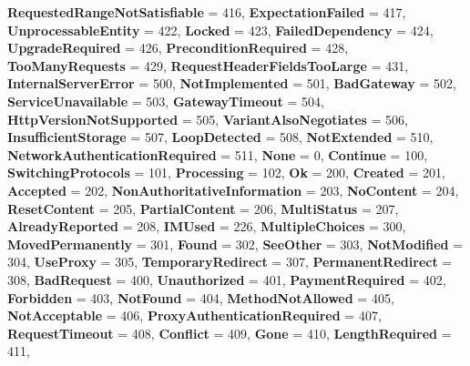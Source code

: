 \begin{DoxyCompactItemize}
{\bfseries Requested\+Range\+Not\+Satisfiable} = 416, 
{\bfseries Expectation\+Failed} = 417, 
{\bfseries Unprocessable\+Entity} = 422, 
{\bfseries Locked} = 423, 
\newline
{\bfseries Failed\+Dependency} = 424, 
{\bfseries Upgrade\+Required} = 426, 
{\bfseries Precondition\+Required} = 428, 
{\bfseries Too\+Many\+Requests} = 429, 
\newline
{\bfseries Request\+Header\+Fields\+Too\+Large} = 431, 
{\bfseries Internal\+Server\+Error} = 500, 
{\bfseries Not\+Implemented} = 501, 
{\bfseries Bad\+Gateway} = 502, 
\newline
{\bfseries Service\+Unavailable} = 503, 
{\bfseries Gateway\+Timeout} = 504, 
{\bfseries Http\+Version\+Not\+Supported} = 505, 
{\bfseries Variant\+Also\+Negotiates} = 506, 
\newline
{\bfseries Insufficient\+Storage} = 507, 
{\bfseries Loop\+Detected} = 508, 
{\bfseries Not\+Extended} = 510, 
{\bfseries Network\+Authentication\+Required} = 511, 
\newline
{\bfseries None} = 0, 
{\bfseries Continue} = 100, 
{\bfseries Switching\+Protocols} = 101, 
{\bfseries Processing} = 102, 
\newline
{\bfseries Ok} = 200, 
{\bfseries Created} = 201, 
{\bfseries Accepted} = 202, 
{\bfseries Non\+Authoritative\+Information} = 203, 
\newline
{\bfseries No\+Content} = 204, 
{\bfseries Reset\+Content} = 205, 
{\bfseries Partial\+Content} = 206, 
{\bfseries Multi\+Status} = 207, 
\newline
{\bfseries Already\+Reported} = 208, 
{\bfseries I\+M\+Used} = 226, 
{\bfseries Multiple\+Choices} = 300, 
{\bfseries Moved\+Permanently} = 301, 
\newline
{\bfseries Found} = 302, 
{\bfseries See\+Other} = 303, 
{\bfseries Not\+Modified} = 304, 
{\bfseries Use\+Proxy} = 305, 
\newline
{\bfseries Temporary\+Redirect} = 307, 
{\bfseries Permanent\+Redirect} = 308, 
{\bfseries Bad\+Request} = 400, 
{\bfseries Unauthorized} = 401, 
\newline
{\bfseries Payment\+Required} = 402, 
{\bfseries Forbidden} = 403, 
{\bfseries Not\+Found} = 404, 
{\bfseries Method\+Not\+Allowed} = 405, 
\newline
{\bfseries Not\+Acceptable} = 406, 
{\bfseries Proxy\+Authentication\+Required} = 407, 
{\bfseries Request\+Timeout} = 408, 
{\bfseries Conflict} = 409, 
\newline
{\bfseries Gone} = 410, 
{\bfseries Length\+Required} = 411, 

\end{DoxyCompactItemize}
